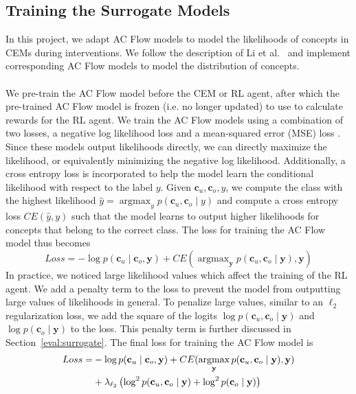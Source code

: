 \subsection{Training the Surrogate Models}\label{method:training-surrogate-model}
In this project, we adapt AC Flow models to model the likelihoods of concepts in CEMs during interventions.
We follow the description of Li et al.~\cite{afa} and implement corresponding AC Flow models to model
the distribution of concepts. \\ \\
We pre-train the AC Flow model before the CEM or RL agent, after which the pre-trained AC Flow model is frozen (i.e. no longer updated) to use to calculate rewards for the RL agent.
We train the AC Flow models using a combination of two losses, a negative
log likelihood loss and a mean-squared error (MSE) loss . 
Since these models output likelihoods directly,
we can directly maximize the likelihood, or equivalently minimizing the negative log likelihood.
Additionally, a cross entropy loss is incorporated to help the model
learn the conditional likelihood with respect to the label $y$. 
Given $\mathbf{c}_u, \mathbf{c}_o, y$, we compute the class with the highest likelihood
$\hat{y} = \mathop{\mathrm{argmax}}_y p(\mathbf{c}_u, \mathbf{c}_o \mid y)$ and compute 
a cross entropy loss $CE(\hat{y}, y)$ such that the model learns to 
output higher likelihoods for concepts that belong to the correct class.
The loss for training the AC Flow model thus becomes
\begin{equation}\label{equation:ac-flow-loss}
Loss = - \log p(\mathbf{c}_u \mid \mathbf{c}_o, \mathbf{y}) +
 CE(\mathop{\mathrm{argmax}}_\mathbf{y} p(\mathbf{c}_u, \mathbf{c}_o \mid \mathbf{y}),  \mathbf{y})
\end{equation}
In practice, we noticed large likelihood values which
affect the training of the RL agent.
We add a penalty term to the loss to prevent 
the model from outputting large values of likelihoods in general.
To penalize
large values, similar to an $\ell_2$ regularization loss,
we add the square of the logits $\log p(\mathbf{c}_u, \mathbf{c}_o \mid \mathbf{y})$ and 
$\log p(\mathbf{c}_o \mid \mathbf{y})$
to the loss. 
This penalty term is further discussed in 
Section~\ref{eval:surrogate}. 
The final loss for training the
AC Flow model is
\begin{align}
Loss = & - \log p(\mathbf{c}_u \mid \mathbf{c}_o, \mathbf{y}) + 
CE(\mathop{\mathrm{argmax}}_\mathbf{y} p(\mathbf{c}_u, \mathbf{c}_o \mid \mathbf{y}),  \mathbf{y}) \notag
\\ & + \lambda_{\ell_2} \left ( \log^2 p(\mathbf{c}_u, \mathbf{c}_o \mid \mathbf{y}) + 
\log^2 p(\mathbf{c}_o \mid \mathbf{y}) \right )
\label{equation:ac-flow-loss-l2}
\end{align}



